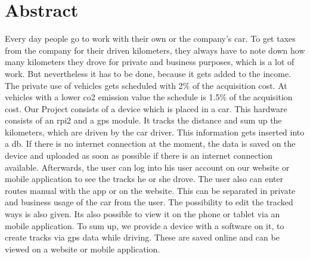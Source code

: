 \chapter*{Abstract}
Every day people go to work with their own or the company's car. To get taxes from the company for their driven kilometers, they always have to note down how many kilometers they drove for private and business purposes, which is a lot of work. But nevertheless it has to be done, because it gets added to the income. The private use of vehicles gets scheduled with 2\% of the acquisition cost. At vehicles with a lower \gls{co2} emission value the schedule is 1.5\% of the acquisition cost.
\newline \newline
Our Project consists of a device which is placed in a car. This hardware consists of an \gls{rpi2} and a \gls{gps} module. It tracks the distance and sum up the kilometers, which are driven by the car driver. This information gets inserted into a \gls{db}. If there is no internet connection at the moment, the data is saved on the device and uploaded as soon as possible if there is an internet connection available. Afterwards, the user can log into his user account on our website or mobile application to see the tracks he or she drove. The user also can enter routes manual with the app or on the website. This can be separated in private and business usage of the car from the user. The possibility to edit the tracked ways is also given. Its also possible to view it on the phone or tablet via an mobile application.
\newline \newline
To sum up, we provide a device with a software on it, to create tracks via \gls{gps} data while driving. These are saved online and can be viewed on a website or mobile application.